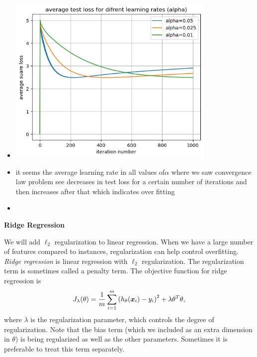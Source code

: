 \documentclass{article}
\newcommand{\nyuparagrah}[1]{\textcolor{nyupurple}{\large #1}}
\begin{document}
\begin{enumerate}
\begin{itemize}
\item \includegraphics[width=10cm]{homework/homework_2/immages/13_1.png}
\item it seems the average learning rate in all values of$\alpha$ where we saw convergence law problem see decreases in test loss for a certain number of iterations and then increases after that which indicates over fitting 
\item 
\end{itemize}
\setcounter{saveenum}{\value{enumi}}
\end{enumerate}

\vspace{0.3cm}
\nyuparagrah{\bf Ridge Regression}

We will add $\ell_2$ regularization to linear regression. When we have a large number of features compared to instances, regularization
can help control overfitting. \emph{Ridge regression} is linear regression
with $\ell_{2}$ regularization. The regularization term is sometimes
called a penalty term. The objective function for ridge regression
is
\[
J_\lambda(\theta)=\frac{1}{m}\sum_{i=1}^{m}\left(h_{\theta}(\boldsymbol{x}_{i})-y_{i}\right)^{2}+\lambda\theta^{T}\theta,
\]
where $\lambda$ is the regularization parameter, which controls the
degree of regularization. Note that the bias term (which we included as an extra dimension in $\theta$) is being regularized
as well as the other parameters. Sometimes it is preferable to treat this term separately.
\end{document}
